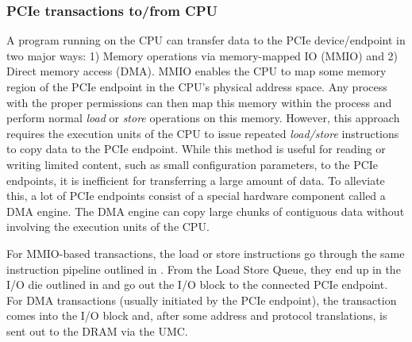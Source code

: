 \subsubsection{PCIe transactions to/from CPU}
\label{subsubsec:interconnect-sc-background-cpu-arch-pcie-transactions}

A program running on the CPU can transfer data to the PCIe device/endpoint in two major ways: 1) Memory operations via memory-mapped IO (MMIO) and 2) Direct memory access (DMA).
MMIO enables the CPU to map some memory region of the PCIe endpoint in the CPU's physical address space.
Any process with the proper permissions can then map this memory within the process and perform normal \textit{load} or \textit{store} operations on this memory.
However, this approach requires the execution units of the CPU to issue repeated \textit{load/store} instructions to copy data to the PCIe endpoint.
While this method is useful for reading or writing limited content, such as small configuration parameters, to the PCIe endpoints, it is inefficient for transferring a large amount of data.
To alleviate this, a lot of PCIe endpoints consist of a special hardware component called a DMA engine.
The DMA engine can copy large chunks of contiguous data without involving the execution units of the CPU.

For MMIO-based transactions, the load or store instructions go through the same instruction pipeline outlined in . 
From the Load Store Queue, they end up in the I/O die outlined in  and go out the I/O block to the connected PCIe endpoint.
For DMA transactions (usually initiated by the PCIe endpoint), the transaction comes into the I/O block and, after some address and protocol translations, is sent out to the DRAM via the UMC.